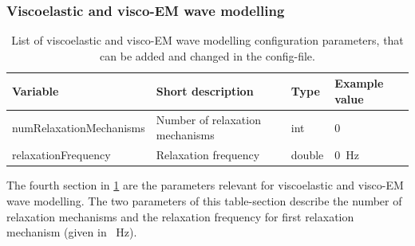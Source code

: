 \documentclass[pdftex,a4paper,parskip,listof=totoc,bibliography=totoc,onehalfspacing,12pt]{scrreprt}
\begin{document}
\subsubsection{Viscoelastic and visco-EM wave modelling}
\begin{table}[h!]
\caption[List of viscoelastic and visco-EM wave modelling configuration parameters.]{List of viscoelastic and visco-EM wave modelling configuration parameters, that can be added and changed in the config-file.}\label{tab:config_visco}
\centering
\begin{adjustbox}{width=1\textwidth,center=\textwidth}
	\begin{tabular}{llll}
	\toprule
	Variable & Short description & Type & Example value \\
	\midrule
	numRelaxationMechanisms & Number of relaxation mechanisms & int & \num{0}\\
	relaxationFrequency& Relaxation frequency& double & \SI{0}{Hz}\\
	\bottomrule
	\end{tabular}
	\end{adjustbox}
\end{table}
The fourth section in \ref{tab:config_visco} are the parameters relevant for viscoelastic and visco-EM wave modelling. The two parameters of this table-section describe the number of relaxation mechanisms and the relaxation frequency for first relaxation mechanism (given in \SI{}{Hz}).
\end{document}
